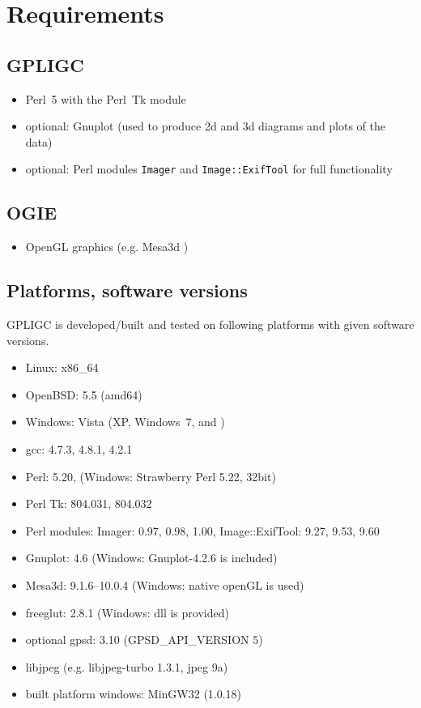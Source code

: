 \section{Requirements}
\label{requirements}

\subsection*{GPLIGC}

\begin{itemize}
\item Perl~5 with the Perl~Tk module \cite{perl,perltk}
\item {\scriptsize optional:} Gnuplot \cite{gnuplot} (used to produce 2d and 3d diagrams and plots of the data)
\item {\scriptsize optional:} Perl modules \texttt{Imager} \cite{imager} and \texttt{Image::ExifTool} \cite{exiftool} for full functionality
\end{itemize}


\subsection*{OGIE}

\begin{itemize}
\item OpenGL graphics (e.g. Mesa3d \cite{mesa})
\end{itemize}


\subsection*{Platforms, software versions}
GPLIGC is developed/built and tested on following platforms with given software versions.

\begin{itemize}
\item Linux: x86\_64
\item OpenBSD: 5.5 (amd64)
\item Windows: Vista (XP, Windows~7, and )
\item gcc: 4.7.3, %
4.8.1, %
4.2.1 %
\item Perl: 5.20, %
(Windows: Strawberry Perl 5.22, 32bit)
\item Perl Tk: 804.031, 804.032
\item Perl modules: Imager: 0.97, 0.98, 1.00, %
Image::ExifTool: 9.27, 9.53, 9.60
\item Gnuplot: 4.6 (Windows: Gnuplot-4.2.6 is included)
\item Mesa3d: 9.1.6--10.0.4 (Windows: native openGL is used)
\item freeglut: 2.8.1 (Windows: dll is provided)
\item {\scriptsize optional} gpsd: 3.10 (GPSD\_API\_VERSION 5)
\item libjpeg (e.g. libjpeg-turbo 1.3.1, jpeg 9a)
\item built platform windows: MinGW32 (1.0.18)
\end{itemize}


